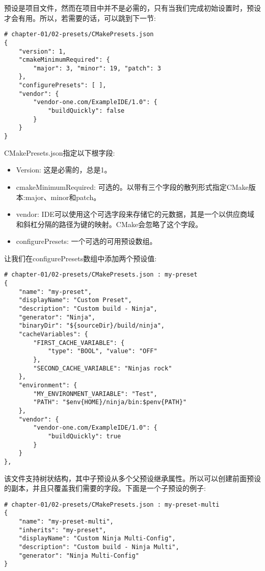 预设是项目文件，然而在项目中并不是必需的，只有当我们完成初始设置时，预设才会有用。所以，若需要的话，可以跳到下一节:

\begin{lstlisting}[style=styleCMake]
# chapter-01/02-presets/CMakePresets.json
{
	"version": 1,
	"cmakeMinimumRequired": {
		"major": 3, "minor": 19, "patch": 3
	},
	"configurePresets": [ ],
	"vendor": {
		"vendor-one.com/ExampleIDE/1.0": {
			"buildQuickly": false
		}
	}
}
\end{lstlisting}

CMakePresets.json指定以下根字段:

\begin{itemize}
\item 
Version: 这是必需的，总是1。

\item 
cmakeMinimumRequired: 可选的。以带有三个字段的散列形式指定CMake版本:major、minor和patch。

\item 
vendor: IDE可以使用这个可选字段来存储它的元数据，其是一个以供应商域和斜杠分隔的路径为键的映射。CMake会忽略了这个字段。

\item 
configurePresets: 一个可选的可用预设数组。
\end{itemize}

让我们在configurePresets数组中添加两个预设值:

\begin{lstlisting}[style=styleCMake]
# chapter-01/02-presets/CMakePresets.json : my-preset
{
	"name": "my-preset",
	"displayName": "Custom Preset",
	"description": "Custom build - Ninja",
	"generator": "Ninja",
	"binaryDir": "${sourceDir}/build/ninja",
	"cacheVariables": {
		"FIRST_CACHE_VARIABLE": {
			"type": "BOOL", "value": "OFF"
		},
		"SECOND_CACHE_VARIABLE": "Ninjas rock"
	},
	"environment": {
		"MY_ENVIRONMENT_VARIABLE": "Test",
		"PATH": "$env{HOME}/ninja/bin:$penv{PATH}"
	},
	"vendor": {
		"vendor-one.com/ExampleIDE/1.0": {
			"buildQuickly": true
		}
	}
},
\end{lstlisting}

该文件支持树状结构，其中子预设从多个父预设继承属性。所以可以创建前面预设的副本，并且只覆盖我们需要的字段。下面是一个子预设的例子:

\begin{lstlisting}[style=styleCMake]
# chapter-01/02-presets/CMakePresets.json : my-preset-multi
{
	"name": "my-preset-multi",
	"inherits": "my-preset",
	"displayName": "Custom Ninja Multi-Config",
	"description": "Custom build - Ninja Multi",
	"generator": "Ninja Multi-Config"
}
\end{lstlisting}


